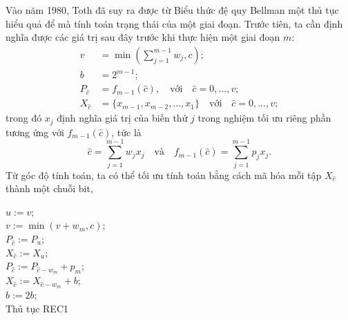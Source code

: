 Vào năm 1980, Toth đã suy ra được từ Biểu thức đệ quy Bellman một thủ tục hiểu quả để mà tính toán trạng thái của một giai đoạn. Trước tiên, ta cần định nghĩa được các giá trị sau đây trước khi thực hiện một giai đoạn $m$:
\begin{align}
    \label{eq:2.30}
    v &= \min\left(\sum_{j=1}^{m-1}w_j, c\right);\\
    \label{eq:2.31}
    b &= 2^{m - 1};\\
    \label{eq:2.32}
    P_{\hat{c}} &= f_{m-1}(\hat{c}), \quad\text{với}\quad\hat{c} = 0, \dots, v;\\
    \label{eq:2.33}
    X_{\hat{c}} & = \{x_{m-1}, x_{m-2}, \dots, x_1\}\quad\text{với}\quad\hat{c} = 0, \dots, v;
\end{align}
trong đó $x_j$ định nghĩa giá trị của biến thứ $j$ trong nghiệm tối ưu riêng phần tương ứng với $f_{m-1}(\hat{c})$, tức là
\begin{equation}
    \hat{c} = \sum_{j=1}^{m-1}w_jx_j\quad\text{và}\quad f_{m-1}(\hat{c}) = \sum_{j=1}^{m-1}p_jx_j.
\end{equation}
Từ góc độ tính toán, ta có thể tối ưu tính toán bằng cách mã hóa mỗi tập $X_{\hat{c}}$ thành một chuỗi bit, 

\begin{algorithm}[H]
    \DontPrintSemicolon
    \vspace{1em}
    \vspace{1em}
    {
        $u:= v$;\\
        $v := \min(v + w_m, c)$;\\
        {
            $P_{\hat{c}} := P_u$;\\
            $X_{\hat{c}} := X_u$;\\
        }
    }
    {
        {
            $P_{\hat{c}} := P_{\hat{c} - w_m} + p_m$;\\
            $X_{\hat{c}} := X_{\hat{c} - w_m} + b$;\\
        }
    }
    $b := 2b$;\\
    \caption{Thủ tục REC1}
    \label{algo:rec1}
\end{algorithm}


